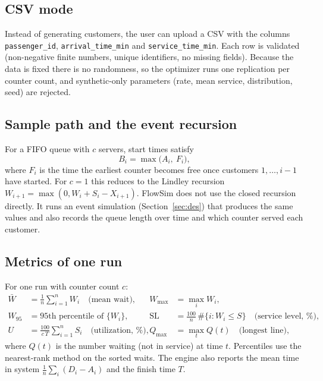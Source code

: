 \documentclass[11pt,a4paper]{article}
\newcommand{\code}[1]{\texttt{#1}}
\begin{document}
\subsection{CSV mode}
Instead of generating customers, the user can upload a CSV with the columns
\code{passenger\_id}, \code{arrival\_time\_min} and \code{service\_time\_min}. Each row is validated (non-negative finite numbers, unique
identifiers, no missing fields). Because the data is fixed there is no randomness, so the optimizer runs one replication
per counter count, and synthetic-only parameters (rate, mean service, distribution, seed) are rejected.

\subsection{Sample path and the event recursion}
For a FIFO queue with $c$ servers, start times satisfy
\[
  B_i = \max\bigl(A_i,\ F_i\bigr),
\]
where $F_i$ is the time the earliest counter becomes free once customers $1,\dots,i-1$ have started. For $c=1$ this reduces to the Lindley recursion $W_{i+1}=\max(0, W_i + S_i - X_{i+1})$. FlowSim does not use the
closed recursion directly. It runs an event simulation (Section~\ref{sec:des}) that produces the same values and also
records the queue length over time and which counter served each customer.

\subsection{Metrics of one run}
For one run with counter count $c$:
\begin{align*}
  \bar W &= \frac1n\sum_{i=1}^n W_i \quad\text{(mean wait)}, &
  W_{\max} &= \max_i W_i, \\
  W_{95} &= \text{95th percentile of } \{W_i\}, &
  \text{SL} &= \frac{100}{n}\,\#\{i: W_i \le S\} \quad\text{(service level, \%)}, \\
  U &= \frac{100}{c\,T}\sum_{i=1}^n S_i \quad\text{(utilization, \%)}, &
  Q_{\max} &= \max_t Q(t) \quad\text{(longest line)},
\end{align*}
where $Q(t)$ is the number waiting (not in service) at time $t$. Percentiles use the nearest-rank method on the sorted waits. The engine also reports the mean time in system $\frac1n\sum_i (D_i-A_i)$ and the finish time $T$.
\end{document}

